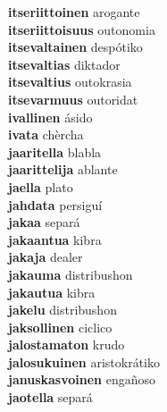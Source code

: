 \textbf{itseriittoinen } arogante \\
\textbf{itseriittoisuus } outonomia \\
\textbf{itsevaltainen } despótiko \\
\textbf{itsevaltias } diktador \\
\textbf{itsevaltius } outokrasia \\
\textbf{itsevarmuus } outoridat \\
\textbf{ivallinen } ásido \\
\textbf{ivata } chèrcha \\
\textbf{jaaritella } blabla \\
\textbf{jaarittelija } ablante \\
\textbf{jaella } plato \\
\textbf{jahdata } persiguí \\
\textbf{jakaa } separá \\
\textbf{jakaantua } kibra \\
\textbf{jakaja } dealer \\
\textbf{jakauma } distribushon \\
\textbf{jakautua } kibra \\
\textbf{jakelu } distribushon \\
\textbf{jaksollinen } ciclico \\
\textbf{jalostamaton } krudo \\
\textbf{jalosukuinen } aristokrátiko \\
\textbf{januskasvoinen } engañoso \\
\textbf{jaotella } separá \\

